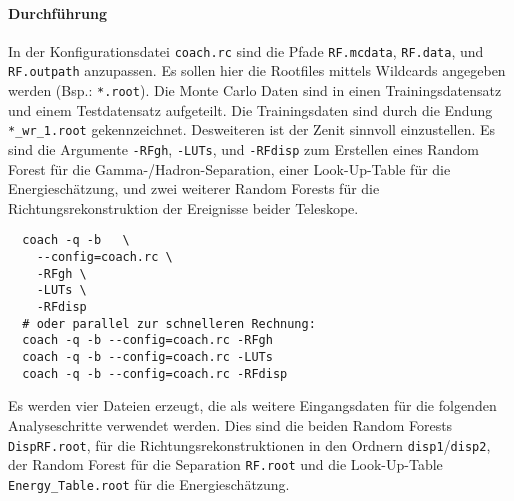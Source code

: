 \paragraph{Durchführung}%
In der Konfigurationsdatei \texttt{coach.rc} sind die Pfade
\texttt{RF.mcdata},
\texttt{RF.data},
und \texttt{RF.outpath}
anzupassen.
Es sollen hier die Rootfiles mittels Wildcards angegeben werden
(Bsp.: \texttt{*.root}).
Die Monte Carlo Daten sind in einen Trainingsdatensatz
und einem Testdatensatz aufgeteilt.
Die Trainingsdaten sind durch die Endung
\texttt{*\_wr\_1.root} gekennzeichnet.
Desweiteren ist der Zenit sinnvoll einzustellen.
Es sind die Argumente
\texttt{-RFgh}, \texttt{-LUTs}, und \texttt{-RFdisp}
zum Erstellen eines Random Forest für die Gamma-/Hadron-Separation,
einer Look-Up-Table für die Energieschätzung,
und zwei weiterer Random Forests für die Richtungsrekonstruktion
der Ereignisse beider Teleskope.

\begin{lstlisting}
  coach -q -b	\
    --config=coach.rc \
    -RFgh \
    -LUTs \
    -RFdisp
  # oder parallel zur schnelleren Rechnung:
  coach -q -b --config=coach.rc -RFgh
  coach -q -b --config=coach.rc -LUTs
  coach -q -b --config=coach.rc -RFdisp
\end{lstlisting}

Es werden vier Dateien erzeugt,
die als weitere Eingangsdaten für die folgenden Analyseschritte verwendet
werden.
Dies sind die beiden Random Forests
\texttt{DispRF.root},
für die Richtungsrekonstruktionen
in den Ordnern \texttt{disp1}/\texttt{disp2},
der Random Forest für die Separation
\texttt{RF.root} und die Look-Up-Table \texttt{Energy\_Table.root} für die
Energieschätzung.
